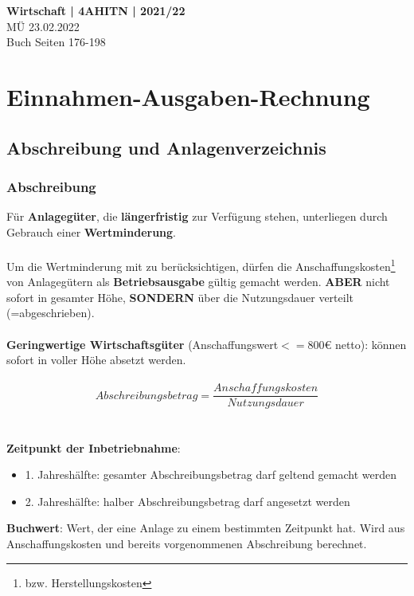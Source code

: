 \documentclass[a4paper, ngerman]{article}
\begin{document}
\begin{framed}

    \begin{center}
        \textbf{Wirtschaft | 4AHITN | 2021/22} \\
        MÜ 23.02.2022 \\
        Buch Seiten 176-198
    \end{center}

\end{framed}

\section{Einnahmen-Ausgaben-Rechnung}
\subsection{Abschreibung und Anlagenverzeichnis}
\subsubsection{Abschreibung}
Für \textbf{Anlagegüter}, die \textbf{längerfristig} zur Verfügung stehen, unterliegen durch Gebrauch einer \textbf{Wertminderung}.
\\ \\
Um die Wertminderung mit zu berücksichtigen, dürfen die Anschaffungskosten\footnote{bzw. Herstellungskosten} von Anlagegütern als \textbf{Betriebsausgabe} gültig gemacht werden.
\textbf{ABER} nicht sofort in gesamter Höhe, \textbf{SONDERN} über die Nutzungsdauer verteilt (=abgeschrieben).
\\ \\
\textbf{Geringwertige Wirtschaftsgüter} (Anschaffungswert$<=$800€ netto): können sofort in voller Höhe absetzt werden.
\\ \\
$$
    Abschreibungsbetrag = \frac{Anschaffungskosten}{Nutzungsdauer}
$$
\\ \\
\textbf{Zeitpunkt der Inbetriebnahme}:
\begin{itemize}
    \item 1. Jahreshälfte: gesamter Abschreibungsbetrag darf geltend gemacht werden
    \item 2. Jahreshälfte: halber  Abschreibungsbetrag darf angesetzt werden
\end{itemize}
\textbf{Buchwert}: Wert, der eine Anlage zu einem bestimmten Zeitpunkt hat. Wird aus Anschaffungskosten und bereits vorgenommenen Abschreibung berechnet.
\end{document}
